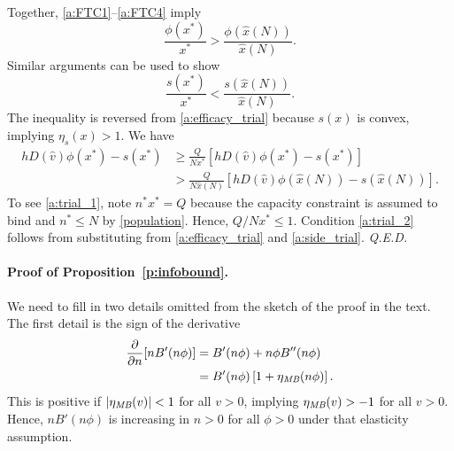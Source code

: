 \documentclass[12pt]{article}
\DeclarePairedDelimiter\abs{\lvert}{\rvert}
\newcommand{\efficacy}{\phi}
\newcommand{\side}{s}
\newcommand{\xh}{\hat{x}}
\newcommand{\benefit}{B}
\newcommand{\MB}{\text{\it MB}}
\newcommand{\elasticity}[1]{\eta_{#1}}
\renewcommand{\qed}{{\it Q.E.D.}}
\begin{document}
Together, \eqref{a:FTC1}--\eqref{a:FTC4} imply 
\begin{equation}
\label{a:efficacy_trial}
\frac{\efficacy(x^*)}{x^*} > \frac{\efficacy(\xh(N))}{\xh(N)}.
\end{equation}
Similar arguments can be used to show 
\begin{equation}
\label{a:side_trial}
\frac{\side(x^*)}{x^*} < \frac{\side(\xh(N))}{\xh(N)}.
\end{equation}
The inequality is reversed from \eqref{a:efficacy_trial} because $\side(x)$ is convex, implying $\elasticity{\side}(x) > 1$. We have
\begin{align}
h D(\hat{v}) \efficacy(x^*) - \side(x^*) & \geq \frac{Q}{N x^*} \left[ h D(\hat{v}) \efficacy(x^*) - \side(x^*) \right] \label{a:trial_1} \\
& > \frac{Q}{N \xh(N)} \left[ h D(\hat{v}) \efficacy(\xh(N)) - \side(\xh(N)) \right]. \label{a:trial_2}
\end{align}
To see \eqref{a:trial_1}, note $n^* x^* = Q$ because the capacity constraint is assumed to bind and $n^* \leq N$ by \eqref{population}. Hence, $Q/N x^* \leq 1$. Condition \eqref{a:trial_2} follows from substituting from \eqref{a:efficacy_trial} and \eqref{a:side_trial}. \qed


\paragraph{Proof of Proposition~\ref{p:infobound}.}

We need to fill in two details omitted from the sketch of the proof in the text. The first detail is the sign of the derivative 
\begin{align}
\frac{\partial}{\partial n} [n \benefit'(n \efficacy)] & = \benefit'(n \efficacy) + n \efficacy \benefit''(n \efficacy) \label{a:elasticity_MB1} \\
& = \benefit'(n \efficacy) \left[ 1 + \elasticity{\MB}(n \efficacy) \right]. \label{a:elasticity_MB2}
\end{align}
This is positive if $\abs{\elasticity{\MB}(v)} < 1$ for all $v > 0$, implying $\elasticity{\MB}(v) > -1 $ for all $v > 0$. Hence, $n \benefit'(n \efficacy)$ is increasing in $n > 0$ for all $\efficacy > 0$ under that elasticity assumption.
\end{document}
